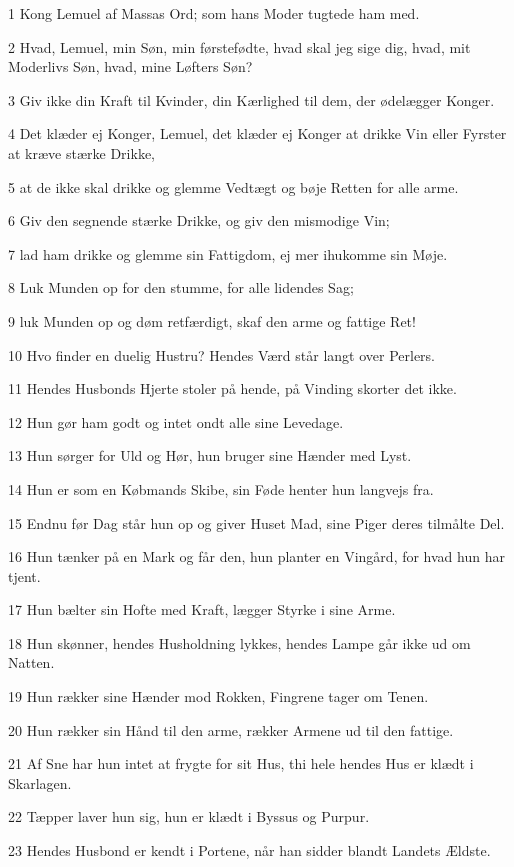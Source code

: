 \par 1 Kong Lemuel af Massas Ord; som hans Moder tugtede ham med.
\par 2 Hvad, Lemuel, min Søn, min førstefødte, hvad skal jeg sige dig, hvad, mit Moderlivs Søn, hvad, mine Løfters Søn?
\par 3 Giv ikke din Kraft til Kvinder, din Kærlighed til dem, der ødelægger Konger.
\par 4 Det klæder ej Konger, Lemuel, det klæder ej Konger at drikke Vin eller Fyrster at kræve stærke Drikke,
\par 5 at de ikke skal drikke og glemme Vedtægt og bøje Retten for alle arme.
\par 6 Giv den segnende stærke Drikke, og giv den mismodige Vin;
\par 7 lad ham drikke og glemme sin Fattigdom, ej mer ihukomme sin Møje.
\par 8 Luk Munden op for den stumme, for alle lidendes Sag;
\par 9 luk Munden op og døm retfærdigt, skaf den arme og fattige Ret!
\par 10 Hvo finder en duelig Hustru? Hendes Værd står langt over Perlers.
\par 11 Hendes Husbonds Hjerte stoler på hende, på Vinding skorter det ikke.
\par 12 Hun gør ham godt og intet ondt alle sine Levedage.
\par 13 Hun sørger for Uld og Hør, hun bruger sine Hænder med Lyst.
\par 14 Hun er som en Købmands Skibe, sin Føde henter hun langvejs fra.
\par 15 Endnu før Dag står hun op og giver Huset Mad, sine Piger deres tilmålte Del.
\par 16 Hun tænker på en Mark og får den, hun planter en Vingård, for hvad hun har tjent.
\par 17 Hun bælter sin Hofte med Kraft, lægger Styrke i sine Arme.
\par 18 Hun skønner, hendes Husholdning lykkes, hendes Lampe går ikke ud om Natten.
\par 19 Hun rækker sine Hænder mod Rokken, Fingrene tager om Tenen.
\par 20 Hun rækker sin Hånd til den arme, rækker Armene ud til den fattige.
\par 21 Af Sne har hun intet at frygte for sit Hus, thi hele hendes Hus er klædt i Skarlagen.
\par 22 Tæpper laver hun sig, hun er klædt i Byssus og Purpur.
\par 23 Hendes Husbond er kendt i Portene, når han sidder blandt Landets Ældste.
